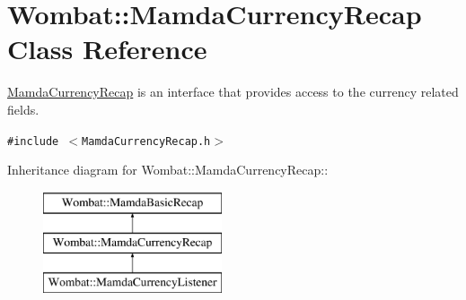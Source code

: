 \hypertarget{classWombat_1_1MamdaCurrencyRecap}{
\section{Wombat::Mamda\-Currency\-Recap Class Reference}
\label{classWombat_1_1MamdaCurrencyRecap}
}
\hyperlink{classWombat_1_1MamdaCurrencyRecap}{Mamda\-Currency\-Recap} is an interface that provides access to the currency related fields.  


{\tt \#include $<$Mamda\-Currency\-Recap.h$>$}

Inheritance diagram for Wombat::Mamda\-Currency\-Recap::\begin{figure}[H]
\begin{center}
\leavevmode
\includegraphics[height=3cm]{classWombat_1_1MamdaCurrencyRecap}
\end{center}
\end{figure}
